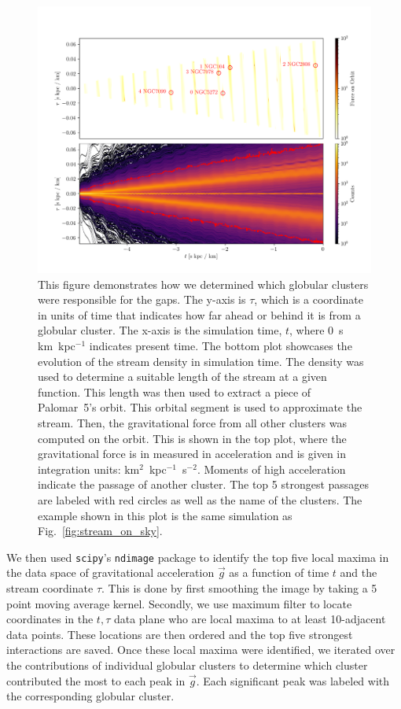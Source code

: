 \documentclass[draft]{aa}
\begin{document}
\begin{appendix}
    \begin{figure}
      \centering
      \includegraphics[width=\linewidth]{force_on_orbit-monte-carlo-009.png}
      \caption{This figure demonstrates how we determined which globular clusters were responsible for the gaps. The y-axis is $\tau$, which is a coordinate in units of time that indicates how far ahead or behind it is from a globular cluster. The x-axis is the simulation time, $t$, where 0~s km~kpc$^{-1}$ indicates present time.  The bottom plot showcases the evolution of the stream density in simulation time. The density was used to determine a suitable length of the stream at a given function. This length was then used to extract a piece of Palomar~5's orbit. This orbital segment is used to approximate the stream. Then, the gravitational force from all other clusters was computed on the orbit. This is shown in the top plot, where the gravitational force is in measured in acceleration and is given in integration units: km$^2$~kpc$^{-1}$~s$^{-2}$. Moments of high acceleration indicate the passage of another cluster. The top 5 strongest passages are labeled with red circles as well as the name of the clusters. The example shown in this plot is the same simulation as Fig.~\ref{fig:stream_on_sky}.}
      \label{fig:force-on-orbit}
    \end{figure}  


    We then used \texttt{scipy}'s \texttt{ndimage} \citep{2020NatMe..17..261V} package to identify the top five local maxima in the data space of gravitational acceleration $\vec{g}$ as a function of time $t$ and the stream coordinate $\tau$. This is done by first smoothing the image by taking a 5 point moving average kernel. Secondly, we use maximum filter to locate coordinates in the $t,\tau$ data plane who are local maxima to at least 10-adjacent data points. These locations are then ordered and the top five strongest interactions are saved. Once these local maxima were identified, we iterated over the contributions of individual globular clusters to determine which cluster contributed the most to each peak in $\vec{g}$. Each significant peak was labeled with the corresponding globular cluster.



\end{appendix}
\end{document}
